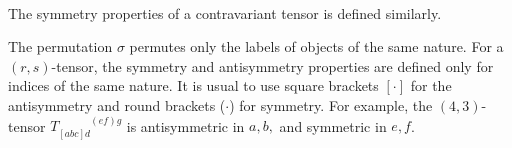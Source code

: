 \,

The symmetry properties of a contravariant tensor is defined similarly. 

\begin{remark}
The permutation $\sigma$ permutes only the labels of objects of the same nature. For a $(r,s)$-tensor, the symmetry and antisymmetry properties are defined only for indices of the same nature. 
It is usual to use square brackets $[\cdot]$ for the antisymmetry and   round brackets ($\cdot$) for symmetry. For example, the $(4,3)$-tensor $T_{[abc]d}^{\phantom{[abc]d}(ef)g}$ is antisymmetric in $a,b,$ and symmetric in $e,f$.
\end{remark}


